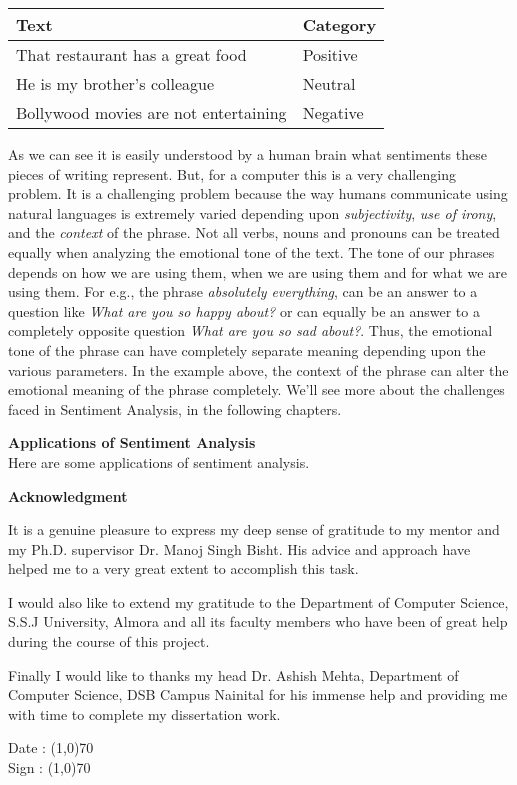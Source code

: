 \documentclass[a4paper, 12pt]{article}
\begin{document}
\begin{sloppypar}
\begin{table}[H]
\begin{tabularx}{\columnwidth}{| X | X |}
\hline
Text & Category \\ [0.5ex]
\hline
\hline
That restaurant has a great food & Positive \\ [0.5ex]
\hline
He is my brother's colleague & Neutral \\ [0.5ex]
\hline
Bollywood movies are not entertaining & Negative \\ [0.5ex]
\hline
\end{tabularx}
\end{table}

As we can see it is easily understood by a human brain what sentiments these pieces of writing represent. But, for a computer this is a very challenging problem. It is a challenging problem because the way humans communicate using natural languages is extremely varied depending  upon \textit{subjectivity}, \textit{use of irony}, and the \textit{context} of the phrase. Not all verbs, nouns and pronouns can be treated equally when analyzing the emotional tone of the text. The tone of our phrases depends on how we are using them, when we are using them and for what we are using them. For e.g., the phrase \textit{absolutely everything}, can be an answer to a question like \textit{What are you so happy about?} or can equally be an answer to a completely opposite  question \textit{What are you so sad about?}. Thus, the emotional tone of the phrase can have completely separate meaning depending upon the various parameters. In the example above, the context of the phrase can alter the emotional meaning of the phrase completely. We'll see more about the challenges faced in Sentiment Analysis, in the following chapters.

\large \textbf{Applications of Sentiment Analysis} \\[0.5ex]
\normalsize
Here are some applications of sentiment analysis.
\clearpage
\printbibliography
\clearpage
\begin{center}
\textbf{Acknowledgment}
\end{center}
It is a genuine pleasure to express my deep sense of gratitude to my mentor and my Ph.D. supervisor Dr. Manoj Singh Bisht. His advice and approach have helped me to a very great extent to accomplish this task. 

I would also like to extend my gratitude to the Department of Computer Science, S.S.J University, Almora and all its faculty members who have been of great help during the course of this project.

Finally I would like to thanks my head Dr. Ashish Mehta, Department of Computer Science, DSB Campus Nainital for his immense help and providing me with time to complete my dissertation work.

\begin{flushright}
Date : \line(1,0){70} \\ [1ex]
Sign : \line(1,0){70}
\end{flushright}
\thispagestyle{empty}
\end{sloppypar}
\end{document}
